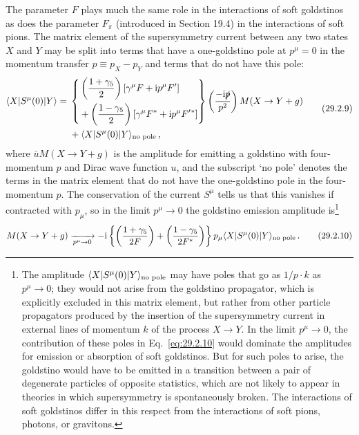 The parameter \(F\) plays much the same role in the interactions of soft
goldstinos as does the parameter \(F_\pi\) (introduced in Section 19.4) in
the interactions of soft pions. The matrix element of the supersymmetry
current between any two states \(X\) and \(Y\) may be split into terms
that have a one-goldstino pole at \(p^\mu=0\) in the momentum transfer
\(p\equiv p_X-p_Y\) and terms that do not have this pole:
\begin{equation}
  \begin{aligned}
  \langle X\rvert S^\mu(0)\lvert Y\rangle
  ={}&
  \left\{
  \begin{aligned}
    &\left(\frac{1+\gamma_5}{2}\right)
      \left[\gamma^\mu F+\mathrm{i} p^\mu F'\right]
    \\
    &+\left(\frac{1-\gamma_5}{2}\right)
      \left[\gamma^\mu F^*+\mathrm{i} p^\mu F'{}^*\right]
  \end{aligned}
  \right\}
  \left(\frac{-\mathrm{i}\slashed{p}}{p^2}\right)
  M(X\to Y+g)
  \\
  &+\langle X\rvert S^\mu(0)\lvert Y\rangle_{\text{no pole}}\,,
  \end{aligned}
  \tag{29.2.9}\label{eq:29.2.9}
\end{equation}
where \(\bar uM(X\to Y+g)\) is the amplitude for emitting a goldstino with
four-momentum \(p\) and Dirac wave function \(u\), and the subscript
`no pole' denotes the terms in the matrix element that do not have the
one-goldstino pole in the four-momentum \(p\). The conservation of the
current \(S^\mu\) tells us that this vanishes if contracted with \(p_\mu\),
so in the limit \(p^\mu\to0\) the goldstino emission amplitude
is\footnote{The amplitude
\(\langle X\rvert S^\mu(0)\lvert Y\rangle_{\text{no pole}}\) may have
poles that go as \(1/p\mathbin{\cdot}k\) as \(p^\mu\to0\); they would not
arise from the goldstino propagator, which is explicitly excluded in this
matrix element, but rather from other particle propagators produced by the
insertion of the supersymmetry current in external lines of momentum \(k\)
of the process \(X\to Y\). In the limit \(p^\mu\to0\), the contribution
of these poles in Eq.~\eqref{eq:29.2.10} would dominate the amplitudes for
emission or absorption of soft goldstinos. But for such poles to arise,
the goldstino would have to be emitted in a transition between a pair of
degenerate particles of opposite statistics, which are not likely to
appear in theories in which supersymmetry is spontaneously broken. The
interactions of soft goldstinos differ in this respect from the
interactions of soft pions, photons, or gravitons.}
\begin{equation}
  M(X\to Y+g)
  \xrightarrow[p^\mu\to0]{}
  -\mathrm{i}\left\{
    \left(\frac{1+\gamma_5}{2F}\right)
    +\left(\frac{1-\gamma_5}{2F^*}\right)
  \right\}
  p_\mu\langle X\rvert S^\mu(0)\lvert Y\rangle_{\text{no pole}}\,.
  \tag{29.2.10}\label{eq:29.2.10}
\end{equation}

